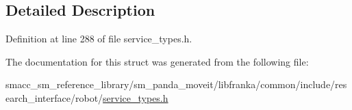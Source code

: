 \subsection{Detailed Description}


Definition at line 288 of file service\+\_\+types.\+h.



The documentation for this struct was generated from the following file\+:\begin{DoxyCompactItemize}
\item 
smacc\+\_\+sm\+\_\+reference\+\_\+library/sm\+\_\+panda\+\_\+moveit/libfranka/common/include/research\+\_\+interface/robot/\hyperlink{service__types_8h}{service\+\_\+types.\+h}\end{DoxyCompactItemize}
